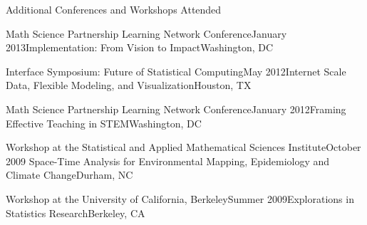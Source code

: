 \documentclass{resume} %
\begin{document}
\begin{rSection}{Additional Conferences and Workshops Attended}
\begin{sSubsection}{Math Science Partnership Learning Network Conference}{}{January 2013}{Implementation: From Vision to Impact}{Washington, DC}
\end{sSubsection}

\begin{sSubsection}{Interface Symposium: Future of Statistical Computing}{}{May 2012}{Internet Scale Data, Flexible Modeling, and Visualization}{Houston, TX}
\end{sSubsection}

\begin{sSubsection}{Math Science Partnership Learning Network Conference}{}{January 2012}{Framing Effective Teaching in STEM}{Washington, DC}
\end{sSubsection}

\begin{sSubsection}{Workshop at the Statistical and Applied Mathematical Sciences Institute}{}{October 2009}{ Space-Time Analysis for Environmental Mapping, Epidemiology and Climate Change}{Durham, NC}
\end{sSubsection}

\begin{sSubsection}{Workshop at the University of California, Berkeley}{}{Summer 2009}{Explorations in Statistics Research}{Berkeley, CA}
\end{sSubsection}
\end{rSection}
\end{document}
